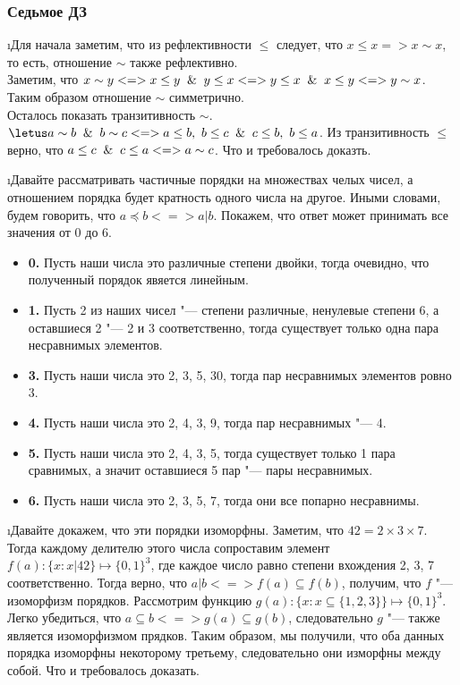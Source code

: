 \subsubsection{Седьмое ДЗ}


\i Для начала заметим, что из рефлективности $\leq$ следует, что $x \leq x => x \sim x$, то есть, отношение $\sim$ также рефлективно.\\
Заметим, что $x \sim y <=> x \leq y \And y \leq x <=> y \leq x \And x \leq y <=> y \sim x$. Таким образом отношение $\sim$ симметрично.\\
Осталось показать транзитивность $\sim$. $\letus a \sim b \And b \sim c <=> a \leq b,\  b \leq c \And c \leq b,\  b \leq a$. Из транзитивность $\leq$ верно, что $a \leq c \And c \leq a <=> a \sim c$. Что и требовалось доказть.

\i Давайте рассматривать частичные порядки на множествах челых чисел, а отношением порядка будет кратность одного числа на другое. Иными словами, будем говорить, что $a \preccurlyeq b <=> a | b$.
Покажем, что ответ может принимать все значения от 0 до 6.
\begin{itemize}
    \item \textbf{0.} Пусть наши числа это различные степени двойки, тогда очевидно, что полученный порядок явяется линейным.
    \item \textbf{1.} Пусть 2 из наших чисел "--- степени различные, ненулевые степени 6, а оставшиеся 2 "--- 2 и 3 соответственно, тогда существует только одна пара несравнимых элементов.
    \item \textbf{3.} Пусть наши числа это 2, 3, 5, 30, тогда пар несравнимых элементов ровно 3.
    \item \textbf{4.} Пусть наши числа это 2, 4, 3, 9, тогда пар несравнимых "--- 4.
    \item \textbf{5.} Пусть наши числа это 2, 4, 3, 5, тогда существует только 1 пара сравнимых, а значит оставшиеся 5 пар "--- пары несравнимых.
    \item \textbf{6.} Пусть наши числа это 2, 3, 5, 7, тогда они все попарно несравнимы.
\end{itemize}

\i Давайте докажем, что эти порядки изоморфны. Заметим, что $42 = 2 \times 3 \times 7$. Тогда каждому делителю этого числа сопроставим элемент $f(a): \{x: x|42\} \mapsto \{0, 1\}^3$, где каждое число равно степени вхождения 2, 3, 7 соответственно. Тогда верно, что $a | b <=> f(a) \subseteq f(b)$, получим, что $f$ "--- изоморфизм порядков. Рассмотрим функцию $g(a): \{x: x\subseteq \{1, 2, 3\}\} \mapsto \{0, 1\}^3$. Легко убедиться, что $a \subseteq b <=> g(a) \subseteq g(b)$, следовательно $g$ "--- также является изоморфизмом прядков. Таким образом, мы получили, что оба данных порядка изоморфны некоторому третьему, следовательно они изморфны между собой. Что и требовалось доказать.

